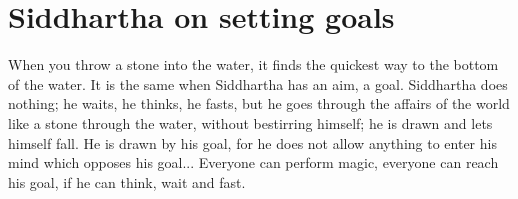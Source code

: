 \section{Siddhartha on setting goals}

\begin{quotex}
When you throw a stone into the water, it finds the quickest way to the bottom of the water. It is the same when Siddhartha has an aim, a goal. Siddhartha does nothing; he waits, he thinks, he fasts, but he goes through the affairs of the world like a stone through the water, without bestirring himself; he is drawn and lets himself fall. He is drawn by his goal, for he does not allow anything to enter his mind which opposes his goal... Everyone can perform magic, everyone can reach his goal, if he can think, wait and fast.


\end{quotex}




